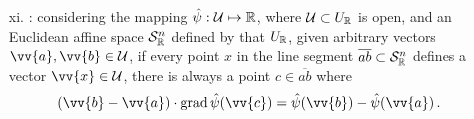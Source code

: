 \begin{itemize}
\item[xi.] : considering the mapping ${\hat\psi} : {\mathcal{{\mathcal{U}}}} \mapsto \mathbb{R}$, where ${\mathcal{U}}\subset U_{\mathbb{R}}$ is open, and an Euclidean affine space ${\mathcal{S}}^{n}_{\mathbb{\mathbb{R}}}$ defined by that $U_{\mathbb{R}}$, given arbitrary vectors $\vv{a},\vv{b}\in{\mathcal{U}}$, if every point $x$ in the line segment $\overline{ab}\subset{\mathcal{S}}^{n}_{\mathbb{\mathbb{R}}}$ defines a vector $\vv{x}\in{\mathcal{U}}$, there is always a point $c\in\overline{ab}$ where
\begin{equation}\label{eq:meanValueVectorFun}
(\vv{b}-\vv{a})\cdot\grad{\fua{{\hat{\psi}}}{\vv{c}}} =\hat{\psi}(\vv{b})-\hat{\psi}(\vv{a})\,.
\end{equation} 
\end{itemize}


